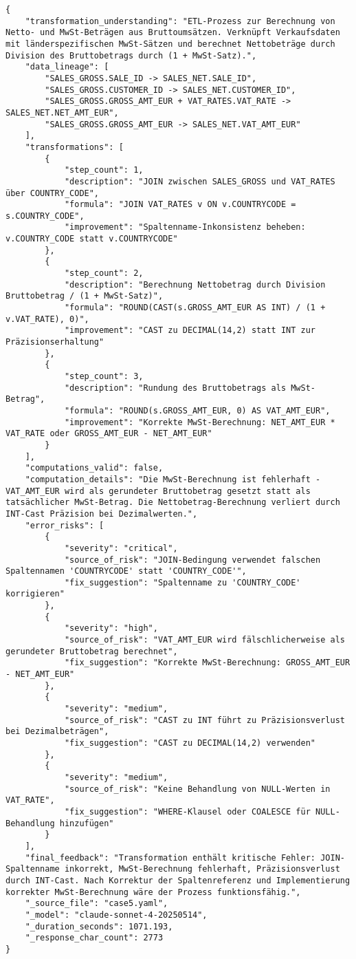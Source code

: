 \begin{lstlisting}[caption={Ausgabe: Claude Sonnet 4 Anwendungsfall 5 Hauptdurchlauf},label={claude_case5_prompt1}]
{
    "transformation_understanding": "ETL-Prozess zur Berechnung von Netto- und MwSt-Beträgen aus Bruttoumsätzen. Verknüpft Verkaufsdaten mit länderspezifischen MwSt-Sätzen und berechnet Nettobeträge durch Division des Bruttobetrags durch (1 + MwSt-Satz).",
    "data_lineage": [
        "SALES_GROSS.SALE_ID -> SALES_NET.SALE_ID",
        "SALES_GROSS.CUSTOMER_ID -> SALES_NET.CUSTOMER_ID",
        "SALES_GROSS.GROSS_AMT_EUR + VAT_RATES.VAT_RATE -> SALES_NET.NET_AMT_EUR",
        "SALES_GROSS.GROSS_AMT_EUR -> SALES_NET.VAT_AMT_EUR"
    ],
    "transformations": [
        {
            "step_count": 1,
            "description": "JOIN zwischen SALES_GROSS und VAT_RATES über COUNTRY_CODE",
            "formula": "JOIN VAT_RATES v ON v.COUNTRYCODE = s.COUNTRY_CODE",
            "improvement": "Spaltenname-Inkonsistenz beheben: v.COUNTRY_CODE statt v.COUNTRYCODE"
        },
        {
            "step_count": 2,
            "description": "Berechnung Nettobetrag durch Division Bruttobetrag / (1 + MwSt-Satz)",
            "formula": "ROUND(CAST(s.GROSS_AMT_EUR AS INT) / (1 + v.VAT_RATE), 0)",
            "improvement": "CAST zu DECIMAL(14,2) statt INT zur Präzisionserhaltung"
        },
        {
            "step_count": 3,
            "description": "Rundung des Bruttobetrags als MwSt-Betrag",
            "formula": "ROUND(s.GROSS_AMT_EUR, 0) AS VAT_AMT_EUR",
            "improvement": "Korrekte MwSt-Berechnung: NET_AMT_EUR * VAT_RATE oder GROSS_AMT_EUR - NET_AMT_EUR"
        }
    ],
    "computations_valid": false,
    "computation_details": "Die MwSt-Berechnung ist fehlerhaft - VAT_AMT_EUR wird als gerundeter Bruttobetrag gesetzt statt als tatsächlicher MwSt-Betrag. Die Nettobetrag-Berechnung verliert durch INT-Cast Präzision bei Dezimalwerten.",
    "error_risks": [
        {
            "severity": "critical",
            "source_of_risk": "JOIN-Bedingung verwendet falschen Spaltennamen 'COUNTRYCODE' statt 'COUNTRY_CODE'",
            "fix_suggestion": "Spaltenname zu 'COUNTRY_CODE' korrigieren"
        },
        {
            "severity": "high",
            "source_of_risk": "VAT_AMT_EUR wird fälschlicherweise als gerundeter Bruttobetrag berechnet",
            "fix_suggestion": "Korrekte MwSt-Berechnung: GROSS_AMT_EUR - NET_AMT_EUR"
        },
        {
            "severity": "medium",
            "source_of_risk": "CAST zu INT führt zu Präzisionsverlust bei Dezimalbeträgen",
            "fix_suggestion": "CAST zu DECIMAL(14,2) verwenden"
        },
        {
            "severity": "medium",
            "source_of_risk": "Keine Behandlung von NULL-Werten in VAT_RATE",
            "fix_suggestion": "WHERE-Klausel oder COALESCE für NULL-Behandlung hinzufügen"
        }
    ],
    "final_feedback": "Transformation enthält kritische Fehler: JOIN-Spaltenname inkorrekt, MwSt-Berechnung fehlerhaft, Präzisionsverlust durch INT-Cast. Nach Korrektur der Spaltenreferenz und Implementierung korrekter MwSt-Berechnung wäre der Prozess funktionsfähig.",
    "_source_file": "case5.yaml",
    "_model": "claude-sonnet-4-20250514",
    "_duration_seconds": 1071.193,
    "_response_char_count": 2773
}
\end{lstlisting}

